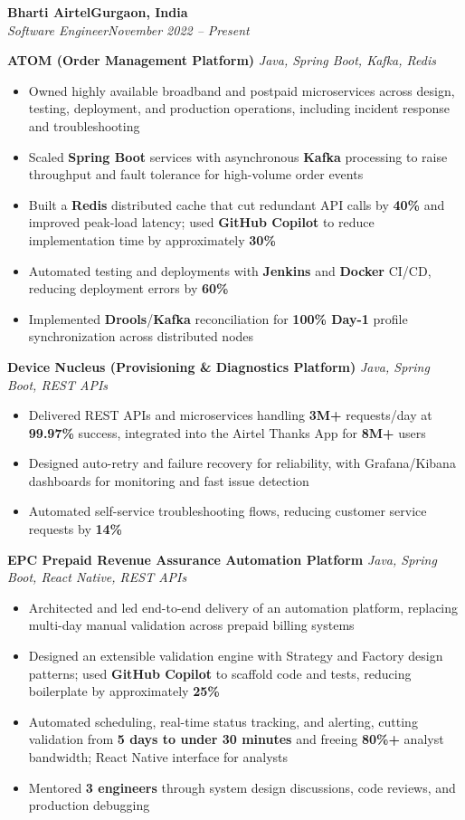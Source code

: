 \documentclass[letterpaper,11pt]{article}
\newcommand{\resumeItem}[1]{
  \item\small{{#1 \vspace{-2pt}}}
}
\newcommand{\resumeSubheading}[4]{
  \vspace{-2pt}\item
    \textbf{#1}\hfill \textbf{\small #2} \\
    \textit{\small #3}\hfill \textit{\small #4}\vspace{-7pt}
}
\newcommand{\resumeItemListStart}{\begin{itemize}}
\newcommand{\resumeItemListEnd}{\end{itemize}\vspace{-5pt}}
\begin{document}
    \resumeSubheading
      {Bharti Airtel}{Gurgaon, India}
      {Software Engineer}{November 2022 -- Present}

      \vspace{4pt}
      \textbf{\small ATOM (Order Management Platform)} \hfill \textit{\small Java, Spring Boot, Kafka, Redis} \\
      \vspace{-2pt}
      \resumeItemListStart
        \resumeItem{Owned highly available broadband and postpaid microservices across design, testing, deployment, and production operations, including incident response and troubleshooting}
        \resumeItem{Scaled \textbf{Spring Boot} services with asynchronous \textbf{Kafka} processing to raise throughput and fault tolerance for high-volume order events}
        \resumeItem{Built a \textbf{Redis} distributed cache that cut redundant API calls by \textbf{40\%} and improved peak-load latency; used \textbf{GitHub Copilot} to reduce implementation time by approximately \textbf{30\%}}
        \resumeItem{Automated testing and deployments with \textbf{Jenkins} and \textbf{Docker} CI/CD, reducing deployment errors by \textbf{60\%}}
        \resumeItem{Implemented \textbf{Drools}/\textbf{Kafka} reconciliation for \textbf{100\% Day-1} profile synchronization across distributed nodes}
      \resumeItemListEnd

      \vspace{4pt}
      \textbf{\small Device Nucleus (Provisioning \& Diagnostics Platform)} \hfill \textit{\small Java, Spring Boot, REST APIs} \\
      \vspace{-2pt}
      \resumeItemListStart
        \resumeItem{Delivered REST APIs and microservices handling \textbf{3M+} requests/day at \textbf{99.97\%} success, integrated into the Airtel Thanks App for \textbf{8M+} users}
        \resumeItem{Designed auto-retry and failure recovery for reliability, with Grafana/Kibana dashboards for monitoring and fast issue detection}
        \resumeItem{Automated self-service troubleshooting flows, reducing customer service requests by \textbf{14\%}}
      \resumeItemListEnd

      \vspace{4pt}
      \textbf{\small EPC Prepaid Revenue Assurance Automation Platform} \hfill \textit{\small Java, Spring Boot, React Native, REST APIs} \\
      \vspace{-2pt}
      \resumeItemListStart
        \resumeItem{Architected and led end-to-end delivery of an automation platform, replacing multi-day manual validation across prepaid billing systems}
        \resumeItem{Designed an extensible validation engine with Strategy and Factory design patterns; used \textbf{GitHub Copilot} to scaffold code and tests, reducing boilerplate by approximately \textbf{25\%}}
        \resumeItem{Automated scheduling, real-time status tracking, and alerting, cutting validation from \textbf{5 days to under 30 minutes} and freeing \textbf{80\%+} analyst bandwidth; React Native interface for analysts}
        \resumeItem{Mentored \textbf{3 engineers} through system design discussions, code reviews, and production debugging}
      \resumeItemListEnd
\end{document}

